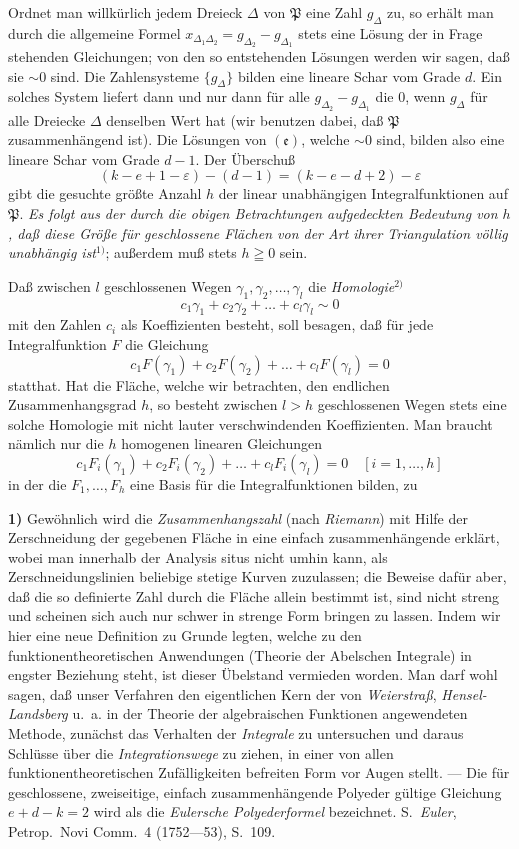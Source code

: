 \documentclass{article}
\begin{document}
Ordnet man willkürlich jedem Dreieck $\Delta$ von $\mathfrak{P}$ eine Zahl $g_\Delta$ zu, so erhält man durch die allgemeine Formel $x_{\Delta_1 \Delta_2} = g_{\Delta_2} - g_{\Delta_1}$ stets eine Lösung der in Frage stehenden Gleichungen; von den so entstehenden Lösungen werden wir sagen, daß sie $\sim 0$ sind. Die Zahlensysteme $\{g_\Delta\}$ bilden eine lineare Schar vom Grade $d$. Ein solches System liefert dann und nur dann für alle $g_{\Delta_2} - g_{\Delta_1}$ die $0$, wenn $g_\Delta$ für alle Dreiecke $\Delta$ denselben Wert hat (wir benutzen dabei, daß $\mathfrak{P}$ zusammenhängend ist). Die Lösungen von $(\mathfrak{e})$, welche $\sim 0$ sind, bilden also eine lineare Schar vom Grade $d - 1$. Der Überschuß
\[ (k - e + 1 - \varepsilon) - (d - 1) = (k - e - d + 2) - \varepsilon \]
gibt die gesuchte größte Anzahl $h$ der linear unabhängigen Integralfunktionen auf $\mathfrak{P}$. \emph{Es folgt aus der durch die obigen Betrachtungen aufgedeckten Bedeutung von $h$, daß diese Größe für geschlossene Flächen von der Art ihrer Triangulation völlig unabhängig ist}${}^{1)}$; außerdem muß stets $h \geqq 0$ sein.

Daß zwischen $l$ geschlossenen Wegen $\gamma_1, \gamma_2, \dots, \gamma_l$ die \emph{Homologie}${}^{2)}$
\[ c_1 \gamma_1 + c_2 \gamma_2 + \dots + c_l \gamma_l \sim 0 \]
mit den Zahlen $c_i$ als Koeffizienten besteht, soll besagen, daß für jede Integralfunktion $F$ die Gleichung
\[ c_1 F(\gamma_1) + c_2 F(\gamma_2) + \dots + c_l F(\gamma_l) = 0 \]
statthat. Hat die Fläche, welche wir betrachten, den endlichen Zusammenhangsgrad $h$, so besteht zwischen $l > h$ geschlossenen Wegen stets eine solche Homologie mit nicht lauter verschwindenden Koeffizienten. Man braucht nämlich nur die $h$ homogenen linearen Gleichungen
\[ c_1 F_i(\gamma_1) + c_2 F_i(\gamma_2) + \dots + c_l F_i(\gamma_l) = 0 \quad [i = 1, \dots, h] \]
in der die $F_1, \dots, F_h$ eine Basis für die Integralfunktionen bilden, zu

\textbf{1)} Gewöhnlich wird die \emph{Zusammenhangszahl} (nach \emph{Riemann}) mit Hilfe der Zerschneidung der gegebenen Fläche in eine einfach zusammenhängende erklärt, wobei man innerhalb der Analysis situs nicht umhin kann, als Zerschneidungslinien beliebige stetige Kurven zuzulassen; die Beweise dafür aber, daß die so definierte Zahl durch die Fläche allein bestimmt ist, sind nicht streng und scheinen sich auch nur schwer in strenge Form bringen zu lassen. Indem wir hier eine neue Definition zu Grunde legten, welche zu den funktionentheoretischen Anwendungen (Theorie der Abelschen Integrale) in engster Beziehung steht, ist dieser Übelstand vermieden worden. Man darf wohl sagen, daß unser Verfahren den eigentlichen Kern der von \emph{Weierstraß}, \emph{Hensel-Landsberg} u.~a. in der Theorie der algebraischen Funktionen angewendeten Methode, zunächst das Verhalten der \emph{Integrale} zu untersuchen und daraus Schlüsse über die \emph{Integrationswege} zu ziehen, in einer von allen funktionentheoretischen Zufälligkeiten befreiten Form vor Augen stellt. --- Die für geschlossene, zweiseitige, einfach zusammenhängende Polyeder gültige Gleichung $e + d - k = 2$ wird als die \emph{Eulersche Polyederformel} bezeichnet. S.~\emph{Euler}, Petrop.\ Novi Comm.\ 4 (1752---53), S.~109.
\end{document}
